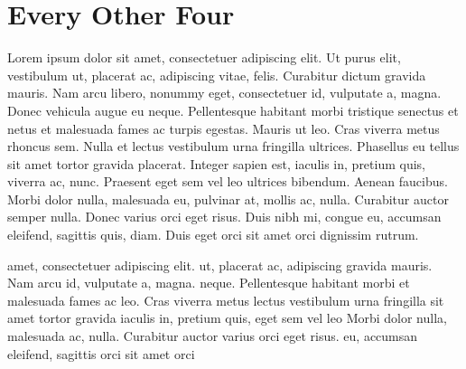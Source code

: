 \documentclass{article}
\begin{document}
\section{Every Other Four}
\begin{minipage}[t]{.5\textwidth}
Lorem ipsum dolor sit amet, consectetuer adipiscing elit. Ut purus
elit, vestibulum ut, placerat ac, adipiscing vitae, felis. Curabitur
dictum gravida mauris. Nam arcu libero, nonummy eget, consectetuer
id, vulputate a, magna. Donec vehicula augue eu neque. Pellentesque
habitant morbi tristique senectus et netus et malesuada fames ac
turpis egestas. Mauris ut leo. Cras viverra metus rhoncus sem. Nulla
et lectus vestibulum urna fringilla ultrices. Phasellus eu tellus
sit amet tortor gravida placerat. Integer sapien est, iaculis in,
pretium quis, viverra ac, nunc. Praesent eget sem vel leo ultrices
bibendum. Aenean faucibus. Morbi dolor nulla, malesuada eu, pulvinar
at, mollis ac, nulla. Curabitur auctor semper nulla.  Donec varius orci
eget risus. Duis nibh mi, congue eu, accumsan eleifend, sagittis quis,
diam. Duis eget orci sit amet orci dignissim rutrum.
\end{minipage}
\begin{minipage}[t]{.5\textwidth}
 amet, consectetuer adipiscing elit.
 ut, placerat ac, adipiscing
 gravida mauris. Nam
arcu  id, vulputate
a, magna.  neque. Pellentesque
habitant morbi  et malesuada
fames ac  leo. Cras viverra
metus  lectus vestibulum urna
fringilla  sit amet tortor
gravida  iaculis in, pretium
quis,  eget sem vel leo
 Morbi dolor nulla,
malesuada  ac, nulla. Curabitur auctor
 varius orci eget risus.  eu, accumsan eleifend, sagittis  orci sit amet orci 
\end{minipage}
\end{document}
